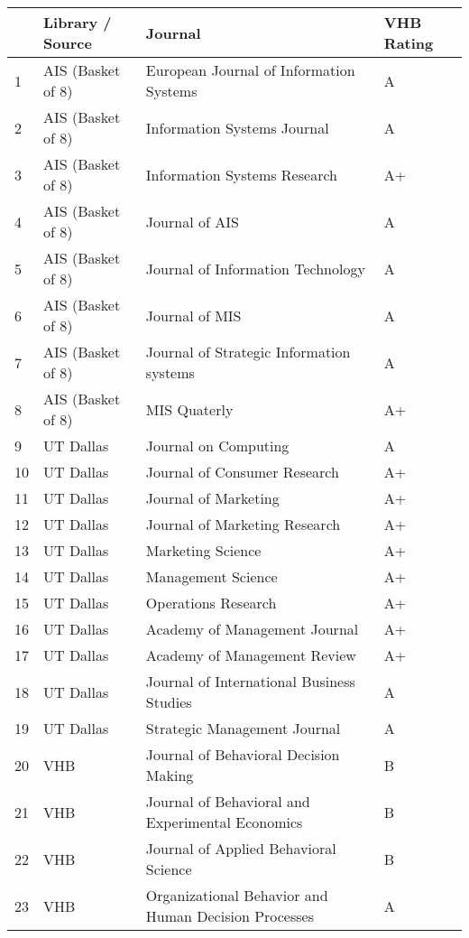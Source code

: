 \begin{table}[h!]
\small
\centering
\begin{tabular}{|l|l|p{9cm}|l|}
\hline
 & \textbf{Library / Source} & \textbf{Journal} & \textbf{VHB Rating} \\ \hline
1 & AIS (Basket of 8) & European Journal of Information Systems & A \\ \hline
2 & AIS (Basket of 8) & Information Systems Journal & A \\ \hline
3 & AIS (Basket of 8) & Information Systems Research & A+ \\ \hline
4 & AIS (Basket of 8) & Journal of AIS & A \\ \hline
5 & AIS (Basket of 8) & Journal of Information Technology & A \\ \hline
6 & AIS (Basket of 8) & Journal of MIS & A \\ \hline
7 & AIS (Basket of 8) & Journal of Strategic Information systems & A \\ \hline
8 & AIS (Basket of 8) & MIS Quaterly & A+ \\ \hline
9 & UT Dallas & Journal on Computing & A \\ \hline
10 & UT Dallas & Journal of Consumer Research & A+ \\ \hline
11 & UT Dallas & Journal of Marketing & A+ \\ \hline
12 & UT Dallas & Journal of Marketing Research & A+ \\ \hline
13 & UT Dallas & Marketing Science & A+ \\ \hline
14 & UT Dallas & Management Science & A+ \\ \hline
15 & UT Dallas & Operations Research & A+ \\ \hline
16 & UT Dallas & Academy of Management Journal & A+ \\ \hline
17 & UT Dallas & Academy of Management Review & A+ \\ \hline
18 & UT Dallas & Journal of International Business Studies & A \\ \hline
19 & UT Dallas & Strategic Management Journal & A \\ \hline
20 & VHB & Journal of Behavioral Decision Making & B \\ \hline
21 & VHB & Journal of Behavioral and Experimental Economics & B \\ \hline
22 & VHB & Journal of Applied Behavioral Science & B \\ \hline
23 & VHB & Organizational Behavior and Human Decision Processes & A \\ \hline

\end{tabular}
\end{table}
